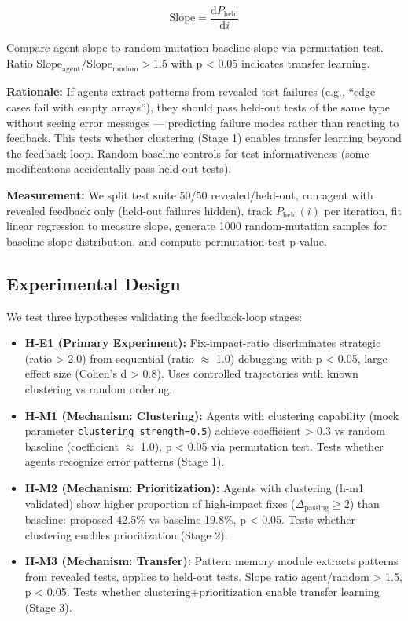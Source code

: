 \begin{equation}
\text{Slope} = \frac{\text{d}P_{\text{held}}}{\text{d}i}
\end{equation}

Compare agent slope to random-mutation baseline slope via permutation test. Ratio $\text{Slope}_{\text{agent}} / \text{Slope}_{\text{random}} > 1.5$ with p < 0.05 indicates transfer learning.

\textbf{Rationale:} If agents extract patterns from revealed test failures (e.g., ``edge cases fail with empty arrays''), they should pass held-out tests of the same type without seeing error messages — predicting failure modes rather than reacting to feedback. This tests whether clustering (Stage 1) enables transfer learning beyond the feedback loop. Random baseline controls for test informativeness (some modifications accidentally pass held-out tests).

\textbf{Measurement:} We split test suite 50/50 revealed/held-out, run agent with revealed feedback only (held-out failures hidden), track $P_{\text{held}}(i)$ per iteration, fit linear regression to measure slope, generate 1000 random-mutation samples for baseline slope distribution, and compute permutation-test p-value.

\subsection{Experimental Design}

We test three hypotheses validating the feedback-loop stages:

\begin{itemize}
\item \textbf{H-E1 (Primary Experiment):} Fix-impact-ratio discriminates strategic (ratio > 2.0) from sequential (ratio $\approx$ 1.0) debugging with p < 0.05, large effect size (Cohen's d > 0.8). Uses controlled trajectories with known clustering vs random ordering.

\item \textbf{H-M1 (Mechanism: Clustering):} Agents with clustering capability (mock parameter \texttt{clustering\_strength=0.5}) achieve coefficient > 0.3 vs random baseline (coefficient $\approx$ 1.0), p < 0.05 via permutation test. Tests whether agents recognize error patterns (Stage 1).

\item \textbf{H-M2 (Mechanism: Prioritization):} Agents with clustering (h-m1 validated) show higher proportion of high-impact fixes ($\Delta_{\text{passing}} \geq 2$) than baseline: proposed 42.5\% vs baseline 19.8\%, p < 0.05. Tests whether clustering enables prioritization (Stage 2).

\item \textbf{H-M3 (Mechanism: Transfer):} Pattern memory module extracts patterns from revealed tests, applies to held-out tests. Slope ratio agent/random > 1.5, p < 0.05. Tests whether clustering+prioritization enable transfer learning (Stage 3).
\end{itemize}

